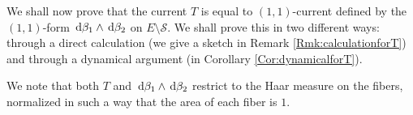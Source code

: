 \documentclass[a4paper,12pt]{article}
\theoremstyle{remark}
\begin{document}

We shall now prove that the current $T$ is equal to $(1,1)$-current defined by the $(1,1)$-form $\,\mathrm d \beta_1 \wedge \,\mathrm d \beta_2$ on $E \setminus \mathcal{S}$. We shall prove this in two different ways: through a direct calculation (we give a sketch in Remark \ref{Rmk:calculationforT}) and through a dynamical argument (in Corollary \ref{Cor:dynamicalforT}).

We note that both $T$ and $\,\mathrm d \beta_1 \wedge \,\mathrm d \beta_2$ restrict to the Haar measure on the fibers, normalized in such a way that the area of each fiber is $1$. 
\end{document}
